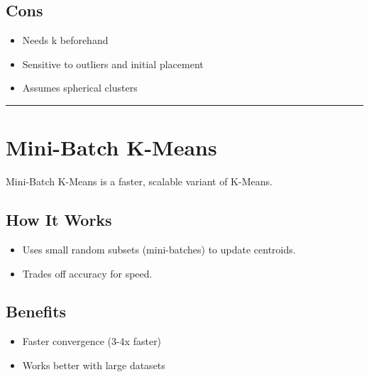 \documentclass[
  letterpaper,
  DIV=11,
  numbers=noendperiod]{scrreprt}
\providecommand{\tightlist}{%
  \setlength{\itemsep}{0pt}\setlength{\parskip}{0pt}}\usepackage{longtable,booktabs,array}
\begin{document}
\subsection{Cons}\label{cons}

\begin{itemize}
\tightlist
\item
  Needs k beforehand
\item
  Sensitive to outliers and initial placement
\item
  Assumes spherical clusters
\end{itemize}

\begin{center}\rule{0.5\linewidth}{0.5pt}\end{center}

\section{Mini-Batch K-Means}\label{mini-batch-k-means}

Mini-Batch K-Means is a faster, scalable variant of K-Means.

\subsection{How It Works}\label{how-it-works-1}

\begin{itemize}
\tightlist
\item
  Uses small random subsets (mini-batches) to update centroids.
\item
  Trades off accuracy for speed.
\end{itemize}

\subsection{Benefits}\label{benefits}

\begin{itemize}
\tightlist
\item
  Faster convergence (3-4x faster)
\item
  Works better with large datasets
\end{itemize}
\end{document}
